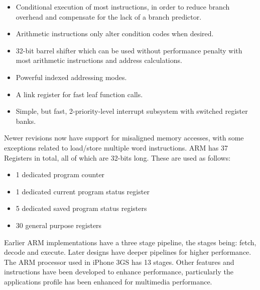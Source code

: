 \begin{itemize}
\item Conditional execution of most instructions, in order to reduce branch overhead and compensate for the lack of a branch predictor.
\item Arithmetic instructions only alter condition codes when desired.
\item 32-bit barrel shifter which can be used without performance penalty with most arithmetic instructions and address calculations.
\item Powerful indexed addressing modes.
\item A link register for fast leaf function calls.
\item Simple, but fast, 2-priority-level interrupt subsystem with switched register banks.
\end{itemize}
Newer revisions now have support for misaligned memory accesses, with some exceptions related to load/store multiple word instructions. ARM has 37 Registers in total, all of which are 32-bits long. These are used as follows:
\begin{itemize}
\item 1 dedicated program counter
\item 1 dedicated current program status register
\item 5 dedicated saved program status registers
\item 30 general purpose registers
\end{itemize}
Earlier ARM implementations have a three stage pipeline, the stages being: fetch, decode and execute. Later designs have deeper pipelines for higher performance. The ARM processor used in iPhone 3GS has 13 stages. Other features and instructions have been developed to enhance performance, particularly the applications profile has been enhanced for multimedia performance.






